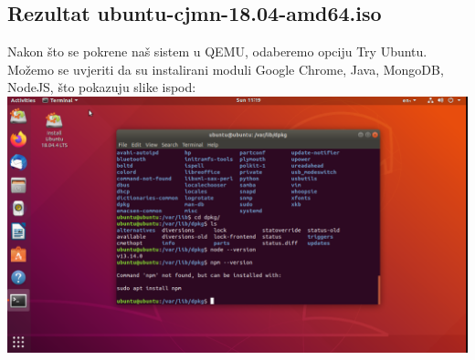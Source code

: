 \documentclass[12pt,vi]{mitthesis}
\begin{document}
\subsection*{Rezultat ubuntu-cjmn-18.04-amd64.iso}
\indent
Nakon što se pokrene naš sistem u QEMU, odaberemo opciju Try Ubuntu. Možemo se uvjeriti da su instalirani moduli Google Chrome, Java, MongoDB, NodeJS, što pokazuju slike ispod:\\
\includegraphics[width=\linewidth]{images/ubuntu-cjmn.png}\\
\end{document}
